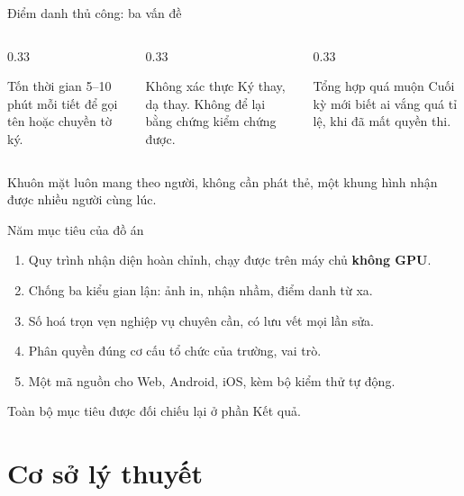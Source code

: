 \documentclass[aspectratio=169, 11pt]{beamer}
\begin{document}
\begin{frame}{Điểm danh thủ công: ba vấn đề}
  \begin{columns}[T]
    \begin{column}{0.33\textwidth}
      \begin{block}{Tốn thời gian}
        5--10 phút mỗi tiết để gọi tên hoặc chuyền tờ ký.
      \end{block}
    \end{column}
    \begin{column}{0.33\textwidth}
      \begin{block}{Không xác thực}
        Ký thay, dạ thay. Không để lại bằng chứng kiểm chứng được.
      \end{block}
    \end{column}
    \begin{column}{0.33\textwidth}
      \begin{block}{Tổng hợp quá muộn}
        Cuối kỳ mới biết ai vắng quá tỉ lệ, khi đã mất quyền thi.
      \end{block}
    \end{column}
  \end{columns}
  \vfill
  \begin{center}
    \small\color{gray700}
    Khuôn mặt luôn mang theo người, không cần phát thẻ, một khung hình
    nhận được nhiều người cùng lúc.
  \end{center}
\end{frame}

\begin{frame}{Năm mục tiêu của đồ án}
  \begin{enumerate}
    \item Quy trình nhận diện hoàn chỉnh, chạy được trên máy chủ \textbf{không GPU}.
    \item Chống ba kiểu gian lận: ảnh in, nhận nhầm, điểm danh từ xa.
    \item Số hoá trọn vẹn nghiệp vụ chuyên cần, có lưu vết mọi lần sửa.
    \item Phân quyền đúng cơ cấu tổ chức của trường, \FsoVaiTro{} vai trò.
    \item Một mã nguồn cho Web, Android, iOS, kèm bộ kiểm thử tự động.
  \end{enumerate}
  \vfill
  {\small\color{gray500}Toàn bộ mục tiêu được đối chiếu lại ở phần Kết quả.}
\end{frame}

\section{Cơ sở lý thuyết}
\end{document}
